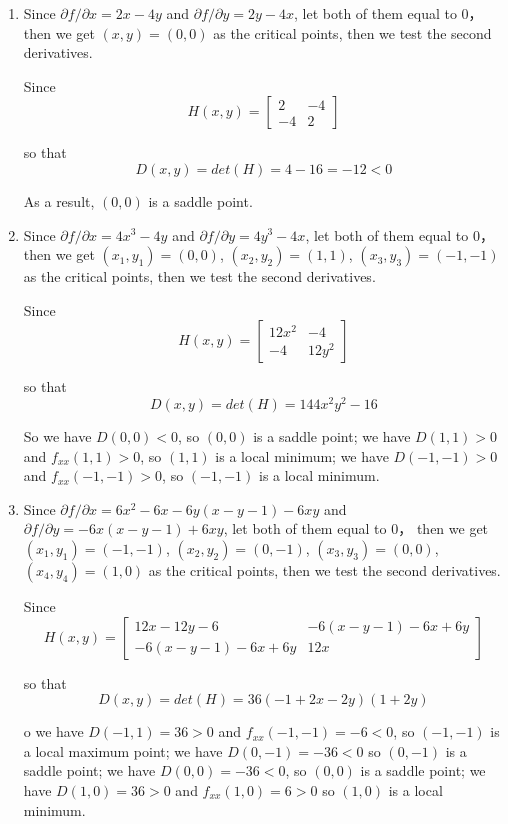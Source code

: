 \documentclass[11pt]{article}
\begin{document}
	\begin{enumerate}
		\item Since $\partial f / \partial x = 2x - 4y$ and $\partial f / \partial y = 2y - 4x$, let both of them equal to $0$， then we get $(x, y) = (0, 0)$ as the critical points, then we test the second derivatives.
		
		Since
		\[H(x, y) = 
		\begin{bmatrix}
			2 & -4\\
			-4 & 2
		\end{bmatrix} \]
		
		so that
		\[D(x, y) = det(H) = 4 - 16 = -12 < 0\]
		
		As a result, $(0, 0)$ is a saddle point.
		
		\item Since $\partial f / \partial x = 4x^3 - 4y$ and $\partial f / \partial y = 4y^3 - 4x$, let both of them equal to $0$， then we get $(x_1, y_1) = (0, 0)$, $(x_2, y_2) = (1, 1)$, $(x_3, y_3) = (-1, -1)$ as the critical points, then we test the second derivatives.
		
		Since
		\[H(x, y) = 
		\begin{bmatrix}
			12x^2 & -4\\
			-4 & 12y^2
		\end{bmatrix} \]
		
		so that
		\[D(x, y) = det(H) = 144x^2y^2 - 16\]
		
		So we have $D(0, 0) < 0$, so $(0, 0)$ is a saddle point; we have $D(1, 1) > 0$ and $f_{xx}(1, 1) > 0$, so $(1, 1)$ is a local minimum; we have $D(-1, -1) > 0$ and $f_{xx}(-1, -1) > 0$, so $(-1, -1)$ is a local minimum.
		
		\item Since $\partial f / \partial x = 6x^2 - 6x - 6y(x - y - 1) - 6xy$ and $\partial f / \partial y = -6x(x - y - 1) + 6xy$, let both of them equal to $0$， then we get $(x_1, y_1) = (-1, -1)$, $(x_2, y_2) = (0, -1)$, $(x_3, y_3) = (0, 0)$, $(x_4, y_4) = (1, 0)$ as the critical points, then we test the second derivatives.
		
		Since
		\[H(x, y) = 
		\begin{bmatrix}
			12x - 12y - 6 & -6(x - y - 1) - 6x + 6y\\
			-6(x - y - 1) - 6x + 6y & 12x
		\end{bmatrix} \]
		
		so that
		\[D(x, y) = det(H) = 36 (-1 + 2 x - 2 y) (1 + 2 y)\]
		
		o we have $D(-1, 1) = 36 > 0$ and $f_{xx}(-1, -1) = -6 < 0$, so $(-1, -1)$ is a local maximum point; we have $D(0, -1) = -36 < 0$ so $(0, -1)$ is a saddle point; we have $D(0, 0) = -36 < 0$, so $(0, 0)$ is a saddle point; we have $D(1, 0) = 36 > 0$ and $f_{xx}(1, 0) = 6 > 0$ so $(1, 0)$ is a local minimum.
		

\end{enumerate}
\end{document}
